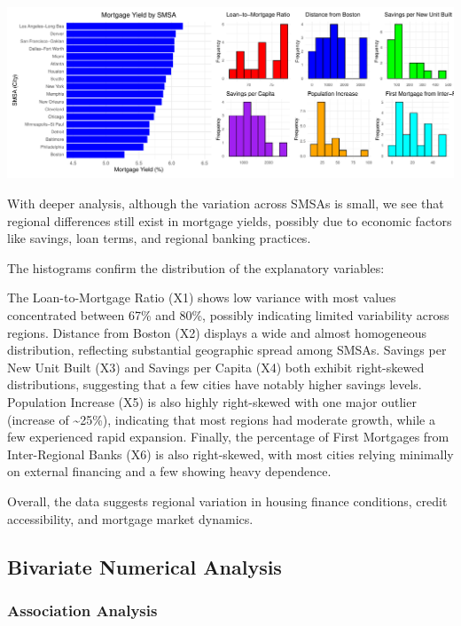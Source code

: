 \documentclass[
  11pt,
]{article}
\begin{document}
\includegraphics{Figs/unnamed-chunk-4-1.pdf}

With deeper analysis, although the variation across SMSAs is small, we
see that regional differences still exist in mortgage yields, possibly
due to economic factors like savings, loan terms, and regional banking
practices.

The histograms confirm the distribution of the explanatory variables:

The Loan-to-Mortgage Ratio (X1) shows low variance with most values
concentrated between 67\% and 80\%, possibly indicating limited
variability across regions. Distance from Boston (X2) displays a wide
and almost homogeneous distribution, reflecting substantial geographic
spread among SMSAs. Savings per New Unit Built (X3) and Savings per
Capita (X4) both exhibit right-skewed distributions, suggesting that a
few cities have notably higher savings levels. Population Increase (X5)
is also highly right-skewed with one major outlier (increase of
\textasciitilde25\%), indicating that most regions had moderate growth,
while a few experienced rapid expansion. Finally, the percentage of
First Mortgages from Inter-Regional Banks (X6) is also right-skewed,
with most cities relying minimally on external financing and a few
showing heavy dependence.

Overall, the data suggests regional variation in housing finance
conditions, credit accessibility, and mortgage market dynamics.

\subsection{Bivariate Numerical
Analysis}\label{bivariate-numerical-analysis}

\subsubsection{Association Analysis}\label{association-analysis}
\end{document}
